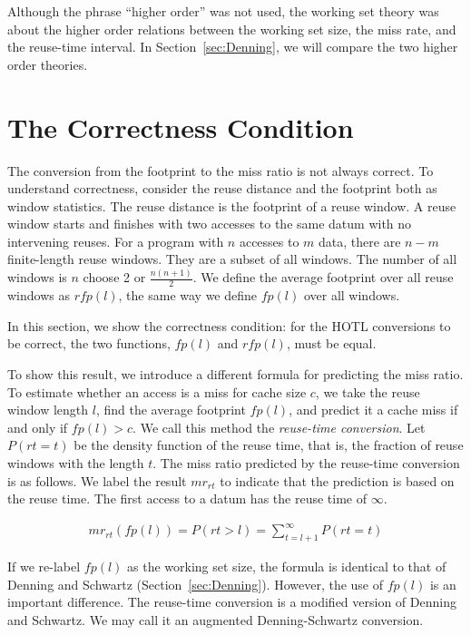 Although the phrase “higher order” was not used, the working set
theory was about the higher order relations between the working set
size, the miss rate, and the reuse-time interval.  In
Section~\ref{sec:Denning}, we will compare the two higher order
theories. 

\section{The Correctness Condition}
\label{sec:thm}

The conversion from the footprint to the miss ratio is not always
correct.  To understand correctness, consider the reuse distance and
the footprint both as window statistics.  The reuse distance is the
footprint of a reuse window.  A reuse window starts and finishes with
two accesses to the same datum with no intervening reuses. For a
program with $n$ accesses  to $m$ data, there are $n-m$ finite-length
reuse windows. They are a subset of all windows.  The number of all
windows is $n$ choose 2 or $\frac{n(n+1)}{2}$.  We define the average
footprint over all reuse windows as $rfp(l)$, the same way we define
$fp(l)$ over all windows.

In this section, we show the correctness condition: for the HOTL
conversions to be correct, the two functions, $fp(l)$ and $rfp(l)$,
must be equal. 

To show this result, we introduce a different formula for predicting
the miss ratio. To estimate whether an access is a miss for cache size
$c$, we take the reuse window length $l$, find the average footprint
$fp(l)$, and predict it a cache miss if and only if $fp(l) > c$.  We
call this method the \emph{reuse-time conversion}.  Let $P(rt=t)$ be
the density function of the reuse time, that is, the fraction of reuse
windows with the length $t$.  The miss ratio predicted by the
reuse-time conversion is as follows.  We label the result $mr_{rt}$ to
indicate that the prediction is based on the reuse time.  The first
access to a datum has the reuse time of $\infty$.

\begin{align*}
mr_{rt}( fp(l) ) = P(rt > l) = \sum_{t=l+1}^{\infty} P(rt = t)
\end{align*}

\noindent If we re-label $fp(l)$ as the working set size, the formula
is identical to that of Denning and Schwartz
(Section~\ref{sec:Denning}).  However, the use of $fp(l)$ is an
important difference.  The reuse-time conversion is a modified version
of Denning and Schwartz. We may call it an augmented Denning-Schwartz
conversion. 

